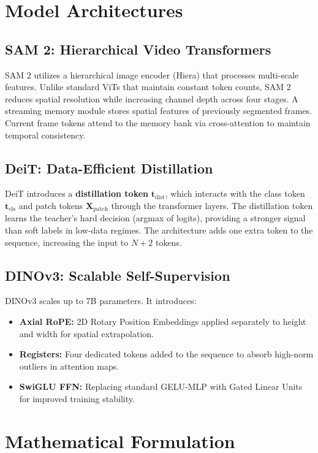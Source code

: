 \documentclass[twocolumn,10pt,a4paper]{article}
\begin{document}
\section{Model Architectures}

\subsection{SAM 2: Hierarchical Video Transformers}
SAM 2 utilizes a hierarchical image encoder (Hiera) that processes multi-scale features. Unlike standard ViTs that maintain constant token counts, SAM 2 reduces spatial resolution while increasing channel depth across four stages. A streaming memory module stores spatial features of previously segmented frames. Current frame tokens attend to the memory bank via cross-attention to maintain temporal consistency.

\subsection{DeiT: Data-Efficient Distillation}
DeiT introduces a \textbf{distillation token} $\mathbf{t}_{\text{dist}}$, which interacts with the class token $\mathbf{t}_{\text{cls}}$ and patch tokens $\mathbf{X}_{\text{patch}}$ through the transformer layers. The distillation token learns the teacher's hard decision (argmax of logits), providing a stronger signal than soft labels in low-data regimes. The architecture adds one extra token to the sequence, increasing the input to $N+2$ tokens.

\subsection{DINOv3: Scalable Self-Supervision}
DINOv3 scales up to 7B parameters. It introduces:
\begin{itemize}
    \item \textbf{Axial RoPE:} 2D Rotary Position Embeddings applied separately to height and width for spatial extrapolation.
    \item \textbf{Registers:} Four dedicated tokens added to the sequence to absorb high-norm outliers in attention maps.
    \item \textbf{SwiGLU FFN:} Replacing standard GELU-MLP with Gated Linear Units for improved training stability.
\end{itemize}

\section{Mathematical Formulation}
\end{document}
